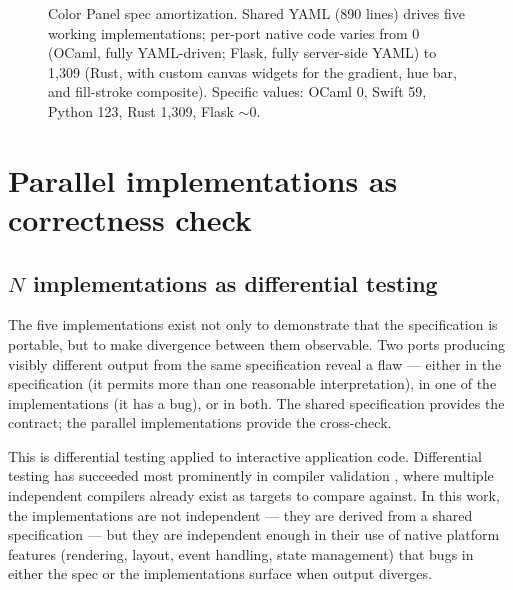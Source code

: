 \documentclass[10pt]{article}
\begin{document}
\begin{figure}[h]
\centering
{}
\caption{Color Panel spec amortization. Shared YAML (890 lines) drives
five working implementations; per-port native code varies from 0 (OCaml,
fully YAML-driven; Flask, fully server-side YAML) to 1{,}309 (Rust, with
custom canvas widgets for the gradient, hue bar, and fill-stroke
composite). Specific values: OCaml 0, Swift 59, Python 123, Rust 1{,}309,
Flask $\sim$0.}
\label{fig:amortization}
\end{figure}

\section{Parallel implementations as correctness check}
\label{sec:nimpl}

\subsection{$N$ implementations as differential testing}

The five implementations exist not only to demonstrate that the
specification is portable, but to make divergence between them observable.
Two ports producing visibly different output from the same specification
reveal a flaw --- either in the specification (it permits more than one
reasonable interpretation), in one of the implementations (it has a bug),
or in both. The shared specification provides the contract; the parallel
implementations provide the cross-check.

This is differential testing \citep{mckeeman1998differential} applied to
interactive application code. Differential testing has succeeded most
prominently in compiler validation \citep{yang2011csmith}, where multiple
independent compilers already exist as targets to compare against. In this
work, the implementations are not independent --- they are derived from a
shared specification --- but they are independent enough in their use of
native platform features (rendering, layout, event handling, state
management) that bugs in either the spec or the implementations surface
when output diverges.
\end{document}

